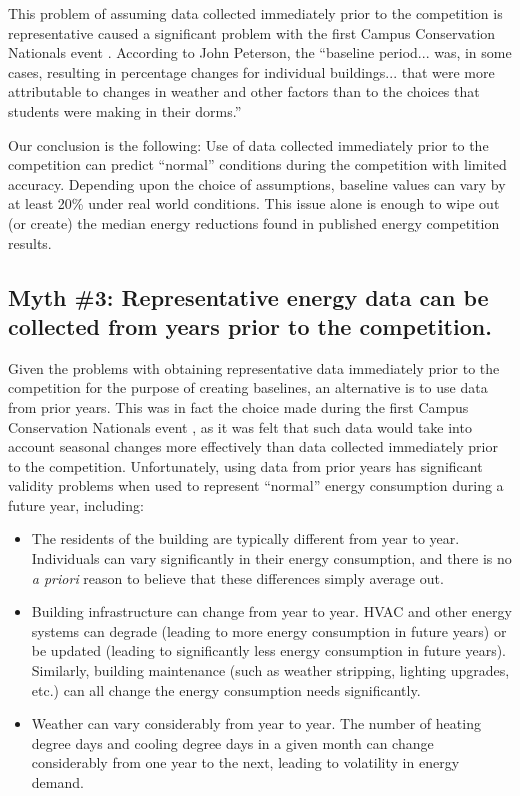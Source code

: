 \documentclass[jou]{apa} %
\begin{document}
This problem of assuming data collected immediately prior to the competition is
representative caused a significant problem with the first Campus Conservation
Nationals event \cite{Willens2010}.  According to John Peterson, the ``baseline
period... was, in some cases, resulting in percentage changes for individual
buildings... that were more attributable to changes in weather and other factors than to
the choices that students were making in their dorms.''

Our conclusion is the following: Use of data collected immediately prior to the
competition can predict ``normal'' conditions during the competition with limited
accuracy. Depending upon the choice of assumptions, baseline values can vary by at least
20\% under real world conditions.  This issue alone is enough to wipe out (or create) the median
energy reductions found in published energy competition results.

\subsection{Myth \#3: Representative energy data can be collected from years  prior to the competition.}

Given the problems with obtaining representative data immediately prior to the competition
for the purpose of creating baselines, an alternative is to use data from prior years.
This was in fact the choice made during the first Campus Conservation Nationals event
\cite{Willens2010}, as it was felt that such data would take into account seasonal changes
more effectively than data collected immediately prior to the competition. Unfortunately,
using data from prior years has significant validity problems when used to represent
``normal'' energy consumption during a future year, including:

\begin{itemize}

\item The residents of the building are typically different from year to year.
  Individuals can vary significantly in their energy consumption, and there is no {\em a
    priori} reason to believe that these differences simply average out. 

\item Building infrastructure can change from year to year. HVAC and other energy systems
  can degrade (leading to more energy consumption in future years) or be updated (leading
  to significantly less energy consumption in future years).  Similarly, building
  maintenance (such as weather stripping, lighting upgrades, etc.) can all change the
  energy consumption needs significantly.

\item Weather can vary considerably from year to year.  The number of heating degree days and cooling
  degree days in a given month can change considerably from one year to the next, leading
  to volatility in energy demand. 

\end{itemize}
\end{document}
